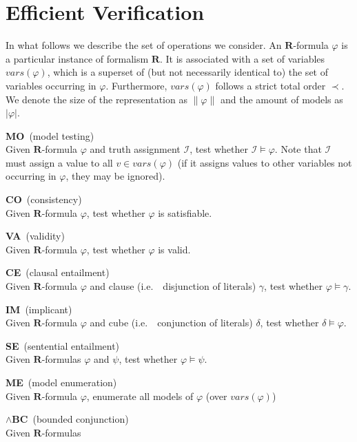 \documentclass{article}
\newcommand{\vars}{\ensuremath{\textit{vars}}}
\newcommand{\ie}{i.e.\ }
\newcommand{\mo}{\textbf{MO}}
\newcommand{\ce}{\textbf{CE}}
\newcommand{\im}{\textbf{IM}}
\newcommand{\se}{\textbf{SE}}
\newcommand{\landbc}{\textbf{$\land$BC}}
\newcommand{\co}{\textbf{CO}}
\newcommand{\va}{\textbf{VA}}
\newcommand{\me}{\textbf{ME}}
\begin{document}
\clearpage
  
\section*{Efficient Verification}
In what follows we describe the set of operations we consider.
An $\mathbf R$-formula $\varphi$ is a particular instance of formalism
$\mathbf R$. It is associated with a set of variables $\vars(\varphi)$, which
is a superset of (but not necessarily identical to) the set of variables
occurring in $\varphi$. Furthermore, $\vars(\varphi)$ follows a strict total
order $\prec$. We denote the size of the representation as $\|\varphi\|$
and the amount of models as $|\varphi|$.


\begin{description}
\begin{small}
\item[\mo\ (model testing)]\hfill\\ Given $\mathbf{R}$-formula $\varphi$ and
  truth assignment $\mathcal I$, test whether $\mathcal I \models
  \varphi$. Note that $\mathcal I$ must assign a value to all $v \in
  \vars(\varphi)$ (if it assigns values to other variables not occurring in
  $\varphi$, they may be ignored).
\item[\co\ (consistency)] \hfill\\ Given $\mathbf R$-formula $\varphi$, test whether
  $\varphi$ is satisfiable.
\item[\va\ (validity)] \hfill\\ Given $\mathbf R$-formula $\varphi$, test whether
  $\varphi$ is valid.
\item[\ce\ (clausal entailment)] \hfill\\ Given $\mathbf R$-formula $\varphi$
  and clause (\ie\ disjunction of literals) $\gamma$, test whether $\varphi\models\gamma$.
\item[\im\ (implicant)] \hfill\\ Given $\mathbf R$-formula $\varphi$
and cube (\ie\ conjunction of literals) $\delta$, test whether $\delta\models\varphi$.
\item[\se\ (sentential entailment)] \hfill\\ Given $\mathbf R$-formulas
  $\varphi$ and $\psi$, test whether $\varphi\models\psi$.
\item[\me\ (model enumeration)] \hfill\\ Given $\mathbf R$-formula $\varphi$,
  enumerate all models of $\varphi$ (over $\vars(\varphi)$)
\item[\landbc\ (bounded conjunction)] \hfill\\ Given $\mathbf R$-formulas

\end{small}
\end{description}
\end{document}

